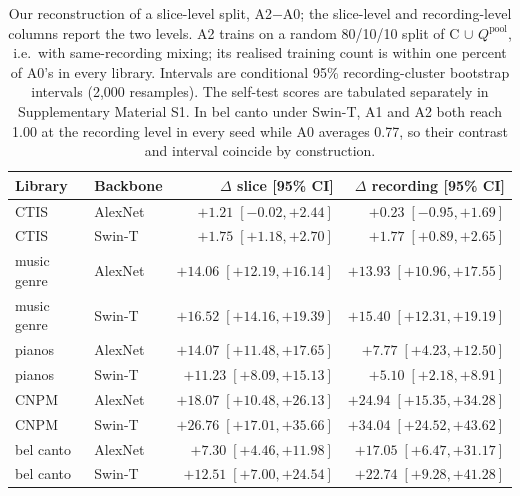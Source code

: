 \begin{table}[t]
\centering
\caption{Our reconstruction of a slice-level split, A2$-$A0; the slice-level and recording-level
columns report the two levels. A2 trains on a random 80/10/10 split of C $\cup$ $Q^{\text{pool}}$, i.e.\ with
same-recording mixing; its realised training count is within one percent of A0's in every
library.
Intervals are conditional 95\% recording-cluster bootstrap intervals (2{,}000 resamples).
The self-test scores are tabulated separately in Supplementary Material S1. In bel canto under
Swin-T, A1 and A2 both reach 1.00 at the recording level in every seed while A0 averages 0.77, so
their contrast and interval coincide by construction.}
\label{tab:a2}
\small
\begin{tabular}{llrr}
\toprule
Library & Backbone & $\Delta$ slice [95\% CI] & $\Delta$ recording [95\% CI] \\
\midrule
CTIS        & AlexNet & $+1.21\;[-0.02,+2.44]$ & $+0.23\;[-0.95,+1.69]$ \\
CTIS        & Swin-T  & $+1.75\;[+1.18,+2.70]$ & $+1.77\;[+0.89,+2.65]$ \\
music genre & AlexNet & $+14.06\;[+12.19,+16.14]$ & $+13.93\;[+10.96,+17.55]$ \\
music genre & Swin-T  & $+16.52\;[+14.16,+19.39]$ & $+15.40\;[+12.31,+19.19]$ \\
pianos      & AlexNet & $+14.07\;[+11.48,+17.65]$ & $+7.77\;[+4.23,+12.50]$ \\
pianos      & Swin-T  & $+11.23\;[+8.09,+15.13]$ & $+5.10\;[+2.18,+8.91]$ \\
CNPM        & AlexNet & $+18.07\;[+10.48,+26.13]$ & $+24.94\;[+15.35,+34.28]$ \\
CNPM        & Swin-T  & $+26.76\;[+17.01,+35.66]$ & $+34.04\;[+24.52,+43.62]$ \\
bel canto  & AlexNet & $+7.30\;[+4.46,+11.98]$ & $+17.05\;[+6.47,+31.17]$ \\
bel canto  & Swin-T  & $+12.51\;[+7.00,+24.54]$ & $+22.74\;[+9.28,+41.28]$ \\
\bottomrule
\end{tabular}
\end{table}

